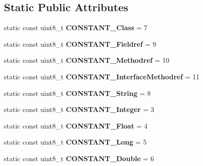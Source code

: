 \subsection*{Static Public Attributes}
\begin{DoxyCompactItemize}
\item 
static const uint8\+\_\+t {\bfseries C\+O\+N\+S\+T\+A\+N\+T\+\_\+\+Class} = 7\hypertarget{classCPInfo_afa2a0609b98677906efec69abd8a48e6}{}\label{classCPInfo_afa2a0609b98677906efec69abd8a48e6}

\item 
static const uint8\+\_\+t {\bfseries C\+O\+N\+S\+T\+A\+N\+T\+\_\+\+Fieldref} = 9\hypertarget{classCPInfo_a55527798317b6fd08bcbfe6052ef16a5}{}\label{classCPInfo_a55527798317b6fd08bcbfe6052ef16a5}

\item 
static const uint8\+\_\+t {\bfseries C\+O\+N\+S\+T\+A\+N\+T\+\_\+\+Methodref} = 10\hypertarget{classCPInfo_a940e4557888d69b7be96c80549fd05f8}{}\label{classCPInfo_a940e4557888d69b7be96c80549fd05f8}

\item 
static const uint8\+\_\+t {\bfseries C\+O\+N\+S\+T\+A\+N\+T\+\_\+\+Interface\+Methodref} = 11\hypertarget{classCPInfo_a3ee335fb3cd4cc6326b5a6c07027f46a}{}\label{classCPInfo_a3ee335fb3cd4cc6326b5a6c07027f46a}

\item 
static const uint8\+\_\+t {\bfseries C\+O\+N\+S\+T\+A\+N\+T\+\_\+\+String} = 8\hypertarget{classCPInfo_a5215334161f77865ffa2aae8606116e6}{}\label{classCPInfo_a5215334161f77865ffa2aae8606116e6}

\item 
static const uint8\+\_\+t {\bfseries C\+O\+N\+S\+T\+A\+N\+T\+\_\+\+Integer} = 3\hypertarget{classCPInfo_a442a6646025f8501cdf7d263e82c3912}{}\label{classCPInfo_a442a6646025f8501cdf7d263e82c3912}

\item 
static const uint8\+\_\+t {\bfseries C\+O\+N\+S\+T\+A\+N\+T\+\_\+\+Float} = 4\hypertarget{classCPInfo_aefa44ca817dd8dd7c07e951eaa472c36}{}\label{classCPInfo_aefa44ca817dd8dd7c07e951eaa472c36}

\item 
static const uint8\+\_\+t {\bfseries C\+O\+N\+S\+T\+A\+N\+T\+\_\+\+Long} = 5\hypertarget{classCPInfo_ac2edc4b97a087c8ffb458043ab38a025}{}\label{classCPInfo_ac2edc4b97a087c8ffb458043ab38a025}

\item 
static const uint8\+\_\+t {\bfseries C\+O\+N\+S\+T\+A\+N\+T\+\_\+\+Double} = 6\hypertarget{classCPInfo_a7e53dd2f4979eabea7224ec11e12f603}{}\label{classCPInfo_a7e53dd2f4979eabea7224ec11e12f603}


\end{DoxyCompactItemize}
